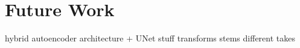 \chapter{Future Work}

hybrid autoencoder architecture + UNet stuff
transforms
stems
different takes

